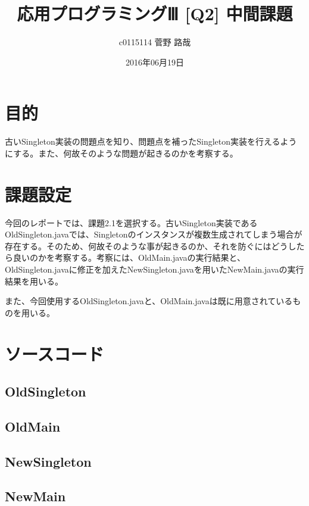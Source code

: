 \documentclass[uplatex]{jsarticle}
\title{応用プログラミングⅢ [Q2] 中間課題}
\author{c0115114 菅野 路哉}
\date{2016年06月19日}
\begin{document}
\maketitle

\section{目的}
古いSingleton実装の問題点を知り、問題点を補ったSingleton実装を行えるようにする。また、何故そのような問題が起きるのかを考察する。


\section{課題設定}
今回のレポートでは、課題2.1を選択する。古いSingleton実装であるOldSingleton.javaでは、Singletonのインスタンスが複数生成されてしまう場合が存在する。そのため、何故そのような事が起きるのか、それを防ぐにはどうしたら良いのかを考察する。考察には、OldMain.javaの実行結果と、OldSingleton.javaに修正を加えたNewSingleton.javaを用いたNewMain.javaの実行結果を用いる。

また、今回使用するOldSingleton.javaと、OldMain.javaは既に用意されているものを用いる。


\section{ソースコード}
\subsection{OldSingleton}


\subsection{OldMain}


\subsection{NewSingleton}


\newpage
\subsection{NewMain}

\end{document}
